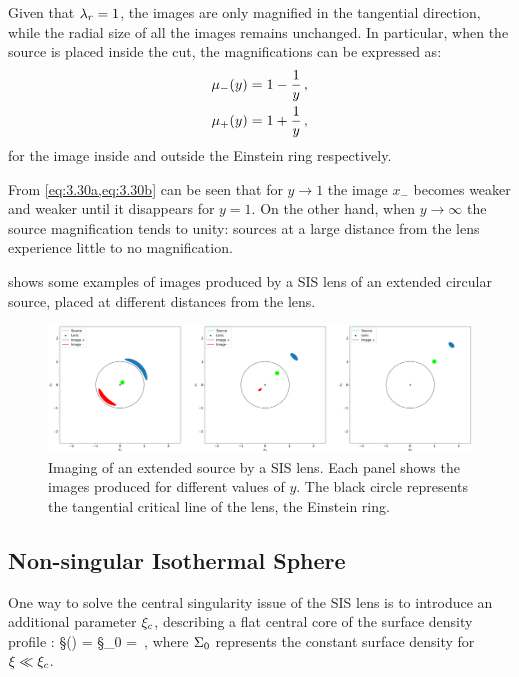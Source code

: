 Given that $\l_r = 1$, the images are only magnified in the tangential direction, while the radial size of all the images remains unchanged. In particular, when the source is placed inside the cut, the magnifications can be expressed as:
\begin{subequations}
\begin{align}
    \label{eq:3.30a}
    \m_- (y) & = 1 - \frac{1}{y} \,,
    \\
    \label{eq:3.30b}
    \m_+ (y) & = 1 + \frac{1}{y} \,,
\end{align}
\end{subequations}
for the image inside and outside the Einstein ring respectively.

From \cref{eq:3.30a,eq:3.30b} can be seen that for $y \rightarrow 1$ the image $x_-$ becomes weaker and weaker until it disappears for $y = 1$. On the other hand, when $y \rightarrow \infty$ the source magnification tends to unity: sources at a large distance from the lens experience little to no magnification.

 shows some examples of images produced by a SIS lens of an extended circular source, placed at different distances from the lens.

\begin{figure}
    \centering
    \includegraphics[width=\linewidth, keepaspectratio]{img//chapter3/sis_extended.png}
    \caption[Imaging of an extended source by a SIS lens]{Imaging of an extended source by a SIS lens. Each panel shows the images produced for different values of $y$. The black circle represents the tangential critical line of the lens, the Einstein ring.}
    \label{fig:sis_extended}
\end{figure}


\subsection{Non-singular Isothermal Sphere}
\label{subsec:nis}
One way to solve the central singularity issue of the SIS lens is to introduce an additional parameter $\x_c$, describing a flat central core of the surface density profile \citep{kormann_isothermal_1994}:
\be
\label{3.31}
\S (\x) =  \quad {} \quad \S_0 =  \,,
\ee
where $\S_0$ represents the constant surface density for $\x \ll \x_c$.


